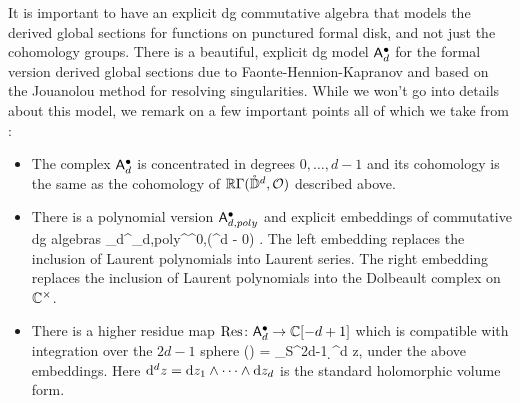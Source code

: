 \documentclass[11pt]{amsart}
\begin{document}
It is important to have an explicit dg commutative algebra that models the derived global sections for functions on punctured formal disk,
and not just the cohomology groups.
There is a beautiful, explicit dg model $\mathsf A^\bullet_d$ for the formal version derived global sections due to Faonte-Hennion-Kapranov \cite{FHK} and based on the Jouanolou method for resolving singularities. 
While we won't go into details about this model, we remark on a few important points all of which we take from \cite{FHK}:
\begin{itemize}
\item The complex $\mathsf A^\bullet_d$ is concentrated in degrees $0,\ldots,d-1$ and its cohomology is the same as the cohomology of $\mathbb R \Gamma(\mathring{\mathbb D}^d, \mathcal O)$ described above.
\item There is a polynomial version $\mathsf A_{d,poly}^\bullet$ and explicit embeddings of commutative dg algebras 
\beqn
\sfA_{d}^\bu \hookleftarrow \sfA_{d,poly}^\bu \hookrightarrow \Omega^{0,\bu}(\CC^d - 0) .
\eeqn
The left embedding replaces the inclusion of Laurent polynomials into Laurent series.
The right embedding replaces the inclusion of Laurent polynomials into the Dolbeault complex on $\mathbb C^\times$.
\item There is a higher residue map $\text{Res} \colon \mathsf A_d^{\bullet} \to \mathbb C[-d+1]$ which is compatible with integration over the $2d-1$ sphere
\beqn
\label{eq:res}
\Res(\alpha) = \oint_{S^{2d-1}} \alpha \wedge \d^d z,
\eeqn
under the above embeddings.
Here ${\rm d}^d z = {\rm d} z_1 \wedge \cdots \wedge {\rm d} z_d$ is the standard holomorphic volume form.
\end{itemize}



\end{document}
